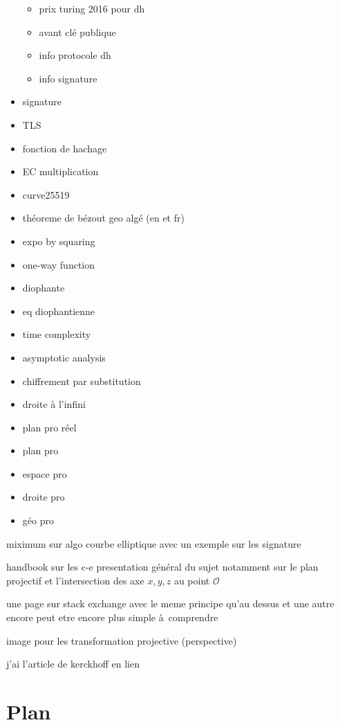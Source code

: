 \begin{itemize}
\begin{itemize}
            \item prix turing 2016 pour dh
            \item avant clé publique
            \item info protocole dh
            \item info signature
        \end{itemize}
    \item signature
    \item TLS
    \item fonction de hachage
    \item EC multiplication
    \item curve25519
    \item théoreme de bézout geo algé (en et fr)
    \item expo by squaring
    \item one-way function
    \item diophante 
    \item eq diophantienne
    \item time complexity
    \item asymptotic analysis
    \item chiffrement par substitution
    \item droite à l'infini
    \item plan pro réel
    \item plan pro
    \item espace pro
    \item droite pro
    \item géo pro
\end{itemize}

miximum sur algo courbe elliptique avec un exemple sur les signature

handbook sur les c-e presentation général du sujet notamment sur le plan projectif et
l'intersection des axe $x,y,z$ au point $\mathcal{O}$
 
une page sur stack exchange avec le meme principe qu'au dessus et une autre encore peut etre
encore plus simple à comprendre

image pour les transformation projective (perspective)

j'ai l'article de kerckhoff en lien


\section{Plan}

